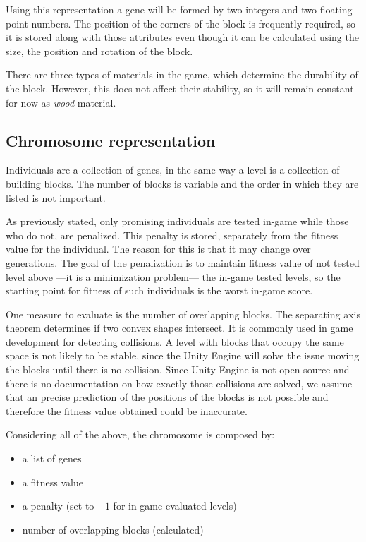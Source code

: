 Using this representation a gene will be formed by two integers and two floating point numbers.
The position of the corners of the block is frequently required, so it is stored along with those attributes even though it can be calculated using the size, the position and rotation of the block. 

There are three types of materials in the game, which determine the durability of the block. However, this does not affect their stability, so it will remain constant for now as \textit{wood} material.


\subsection{Chromosome representation}

Individuals are a collection of genes, in the same way a level is a collection of building blocks. The number of blocks is variable and the order in which they are listed is not important. 

As previously stated, only promising individuals are tested in-game while those who do not,  are penalized. This penalty is stored, separately from the fitness value for the individual. The reason for this is that it may change over generations. The goal of the penalization is to maintain fitness value of not tested level above ---it is a minimization problem--- the in-game tested levels, so the starting point for fitness of such individuals is the worst in-game score.

One measure to evaluate is the number of overlapping blocks. The separating axis theorem\cite{ericson2004real} determines if two convex shapes intersect. It is commonly used in game development for detecting collisions. A level with blocks that occupy the same space is not likely to be stable, since the Unity Engine will solve the issue moving the blocks until there is no collision. Since Unity Engine is not open source and there is no documentation on how exactly those collisions are solved, we assume that an precise prediction of the positions of the blocks is not possible  and therefore the fitness value obtained could be inaccurate. 

Considering all of the above, the chromosome is composed by:
\begin{itemize}
	\item a list of genes
	\item a fitness value
	\item a penalty (set to $-1$ for in-game evaluated levels)
	\item number of overlapping blocks (calculated) 
\end{itemize}


